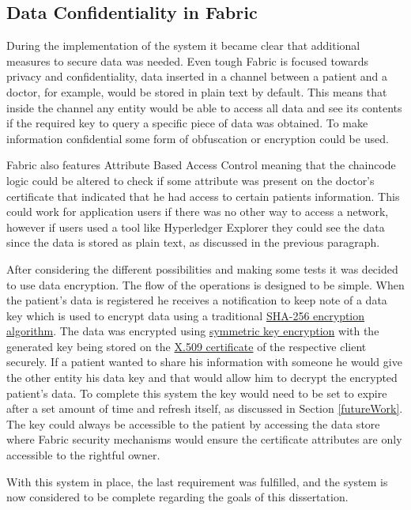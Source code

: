 \subsection{Data Confidentiality in Fabric}

During the implementation of the system it became clear that additional
measures to secure data was needed. Even tough Fabric is focused towards
privacy and confidentiality, data inserted in a channel between a patient and a
doctor, for example, would be stored in plain text by default. This means that
inside the channel any entity would be able to access all data and see its
contents if the required key to query a specific piece of data was obtained.
To make information confidential some form of obfuscation or encryption could
be used. 

Fabric also features Attribute Based Access Control meaning that the chaincode
logic could be altered to check if some attribute was present on the doctor's
certificate that indicated that he had access to certain patients information.
This could work for application users if there was no other way to access a
network, however if users used a tool like Hyperledger Explorer they could see
the data since the data is stored as plain text, as discussed in the previous
paragraph.

After considering the different possibilities and making some tests it was
decided to use data encryption. The flow of the operations is designed to be
simple. When the patient's data is registered he receives a notification to
keep note of a data key which is used to encrypt data using a traditional
\href{https://en.wikipedia.org/wiki/SHA-2}{SHA-256 encryption algorithm}. The
data was encrypted using
\href{https://www.ibm.com/support/knowledgecenter/en/SSB23S_1.1.0.14/gtps7/s7symm.html}{symmetric
key encryption} with the generated key being stored on the
\href{https://en.wikipedia.org/wiki/X.509}{X.509 certificate} of the respective
client securely. If a patient wanted to share his information with someone he
would give the other entity his data key and that would allow him to decrypt
the encrypted patient's data. To complete this system the key would need to be
set to expire after a set amount of time and refresh itself, as discussed in
Section \ref{futureWork}. The key could always be accessible to the patient by
accessing the data store where Fabric security mechanisms would ensure the
certificate attributes are only accessible to the rightful owner.

With this system in place, the last requirement was fulfilled, and the system
is now considered to be complete regarding the goals of this dissertation.

